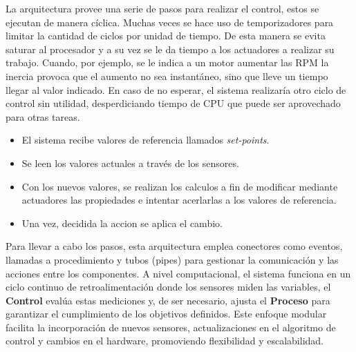 La arquitectura provee una serie de pasos para realizar el control, estos se ejecutan de manera cíclica. Muchas veces se hace uso de temporizadores para limitar la cantidad de ciclos por unidad de tiempo. De esta manera se evita saturar al procesador y a su vez se le da tiempo a los actuadores a realizar su trabajo. Cuando, por ejemplo, se le indica a un motor aumentar las \gls{RPM} la inercia provoca que el aumento no sea instantáneo, sino que lleve un tiempo llegar al valor indicado. En caso de no esperar, el sistema realizaría otro ciclo de control sin utilidad, desperdiciando tiempo de \gls{CPU} que puede ser aprovechado para otras tareas.

\begin{itemize}
\item El sistema recibe valores de referencia llamados \textit{set-points}.
\item Se leen los valores actuales a través de los sensores.
\item Con los nuevos valores, se realizan los calculos a fin de modificar mediante actuadores las propiedades e intentar acerlarlas a los valores de referencia.
\item Una vez, decidida la accion se aplica el cambio.
\end{itemize}


Para llevar a cabo los pasos, esta arquitectura emplea conectores como eventos, llamadas a procedimiento y tubos (pipes) para gestionar la comunicación y las acciones entre los componentes. A nivel computacional, el sistema funciona en un ciclo continuo de retroalimentación donde los sensores miden las variables, el \textbf{Control} evalúa estas mediciones y, de ser necesario, ajusta el \textbf{Proceso} para garantizar el cumplimiento de los objetivos definidos. Este enfoque modular facilita la incorporación de nuevos sensores, actualizaciones en el algoritmo de control y cambios en el hardware, promoviendo flexibilidad y escalabilidad.

